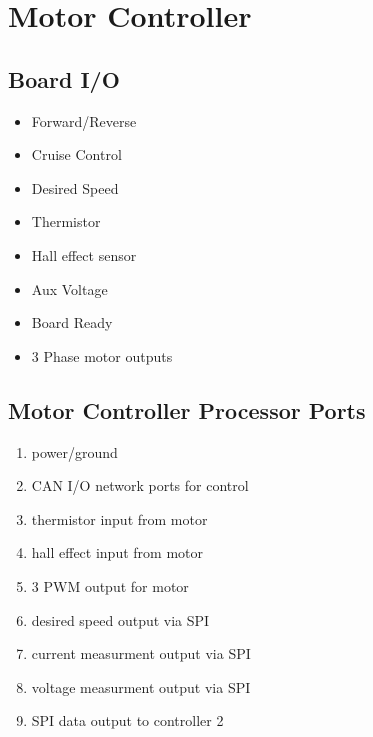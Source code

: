 \documentclass[letterpaper,12pt]{article}
\begin{document}
\pagebreak
\section{Motor Controller}
   \subsection{Board I/O}
   \begin{multicols}{2}
   
   \begin{itemize}
      \item Forward/Reverse
      \item Cruise Control
      \item Desired Speed
   \end{itemize}
   
   \begin{itemize}
      \item Thermistor
      \item Hall effect sensor
      \item Aux Voltage   
   \end{itemize}
   
   \columnbreak
   

   \begin{itemize}
      \item Board Ready
   \end{itemize}
   
   \begin{itemize}
      \item 3 Phase motor outputs
   \end{itemize}
   \end{multicols}


   \subsection{Motor Controller Processor Ports}
   \begin{multicols}{2}
   \begin{enumerate}[(a.)]
      \item power/ground
      \item CAN I/O network ports for control
      \item thermistor input from motor
      \item hall effect input from motor

      \item 3 PWM output for motor
      \item desired speed output via SPI
      \item current measurment output via SPI
      \item voltage measurment output via SPI
      \item SPI data output to controller 2
   \end{enumerate}
   \end{multicols}
\end{document}
